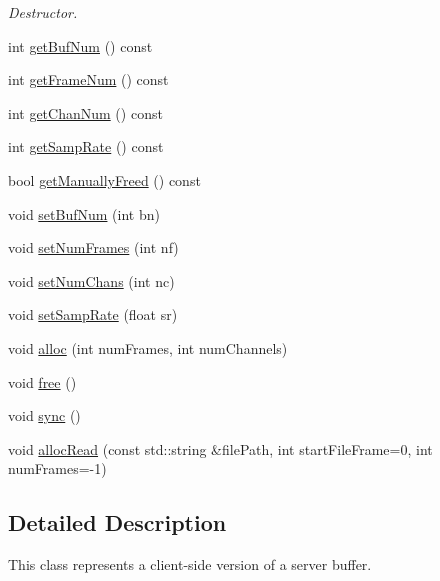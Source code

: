 \begin{DoxyCompactItemize}
\begin{DoxyCompactList}\small\item\em Destructor. \end{DoxyCompactList}\item 
int \hyperlink{classsc_1_1Buffer_af777b92a6ba7b4330fb9958141282cc9}{get\-Buf\-Num} () const 
\item 
int \hyperlink{classsc_1_1Buffer_a591c50bcaae889d763ff28688febeb71}{get\-Frame\-Num} () const 
\item 
int \hyperlink{classsc_1_1Buffer_a57f2455044a2303a1fba1d17e2a7470c}{get\-Chan\-Num} () const 
\item 
int \hyperlink{classsc_1_1Buffer_a15c75bed82addc4ec16b74e98e5ee770}{get\-Samp\-Rate} () const 
\item 
bool \hyperlink{classsc_1_1Buffer_aa3002f528e1eda702d29626004069491}{get\-Manually\-Freed} () const 
\item 
void \hyperlink{classsc_1_1Buffer_a444402b37e84ca30c529df66749c897d}{set\-Buf\-Num} (int bn)
\item 
void \hyperlink{classsc_1_1Buffer_a355daa27d196ea9b7c2a5d703c630521}{set\-Num\-Frames} (int nf)
\item 
void \hyperlink{classsc_1_1Buffer_afd3831ddbad9748d31dd6260ba6392fc}{set\-Num\-Chans} (int nc)
\item 
void \hyperlink{classsc_1_1Buffer_a9ba693d9d86afaccce4d76788dcaff80}{set\-Samp\-Rate} (float sr)
\item 
void \hyperlink{classsc_1_1Buffer_aea7cfaacdfee70a766d18f0a167f7612}{alloc} (int num\-Frames, int num\-Channels)
\item 
void \hyperlink{classsc_1_1Buffer_a94deb84c1e5375bb1922092fe9f1f5e6}{free} ()
\item 
void \hyperlink{classsc_1_1Buffer_a1577c3e412d9e528ddd17d1e95c95369}{sync} ()
\item 
void \hyperlink{classsc_1_1Buffer_ac55059fa09102a7bf96e22c8dc7a3804}{alloc\-Read} (const std\-::string \&file\-Path, int start\-File\-Frame=0, int num\-Frames=-\/1)
\end{DoxyCompactItemize}


\subsection{Detailed Description}
This class represents a client-\/side version of a server buffer. 

